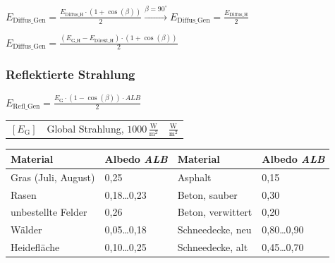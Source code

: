 $
\boxed{E_{\mathrm{Diffus\_Gen}} = \frac{E_{\mathrm{Diffus\_H}} \cdot (1 + \cos(\beta))}{2}}
\overset{\beta = 90 ^\circ}{\longrightarrow}
\boxed{E_{\mathrm{Diffus\_Gen}} = \frac{E_{\mathrm{Diffus\_H}}}{2}}
$

$\boxed{E_{\mathrm{Diffus\_Gen}} = \frac{(E_{\mathrm{G\_H}} - E_{\mathrm{Direkt\_H}}) \cdot (1 + \cos(\beta))}{2}}$

\subsubsection{Reﬂektierte Strahlung}

$
\boxed{E_{\mathrm{Refl\_Gen}} = \frac{E_{\mathrm{G}} \cdot (1 - \cos(\beta)) \cdot ALB}{2}}
$
\renewcommand{\arraystretch}{1.2}
    \begin{tabular}{@{} l p{3.5cm} l @{}}
        $[E_\mathrm{G}]$   & Global Strahlung, $1000 \, \mathrm{\frac{W}{m^2}}$ \dotfill  & $\frac{\mathrm{W}}{\mathrm{m^2}}$ \\
    \end{tabular}

\vspace{0.1cm}

\begin{tabular}{|ll|ll|}
\hline
\textbf{Material} & \textbf{Albedo \textit{ALB}} & \textbf{Material} & \textbf{Albedo \textit{ALB}} \\
\hline
Gras (Juli, August) & 0{,}25 & Asphalt & 0{,}15 \\
Rasen & 0{,}18\dots0{,}23 & Beton, sauber & 0{,}30 \\
unbestellte Felder & 0{,}26 & Beton, verwittert & 0{,}20 \\
Wälder & 0{,}05\dots0{,}18 & Schneedecke, neu & 0{,}80\dots0{,}90 \\
Heidefläche & 0{,}10\dots0{,}25 & Schneedecke, alt & 0{,}45\dots0{,}70 \\
\hline
\end{tabular}


